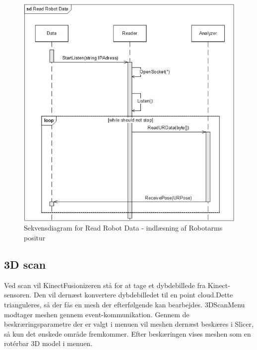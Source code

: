 \begin{figure}[H]
    \centering
    \includegraphics[width=1\textwidth]{figurer/d/Design/Sequence/sd_reading}
    \caption{Sekvensdiagram for Read Robot Data - indlæsning af Robotarms positur}
    \label{sd_reading}
\end{figure}

\subsection{3D scan}
Ved scan vil KinectFusionizeren stå for at tage et dybdebillede fra Kinect-sensoren.
Den vil dernæst konvertere dybdebilledet til en point cloud.Dette trianguleres, så der fås en mesh der efterfølgende kan bearbejdes. 3DScanMenu modtager meshen gennem event-kommunikation.
Gennem de beskræringsparametre der er valgt i menuen vil meshen dernæst beskæres i Slicer, så kun det ønskede område fremkommer. Efter beskæringen vises meshen som en rotérbar 3D model i menuen.

